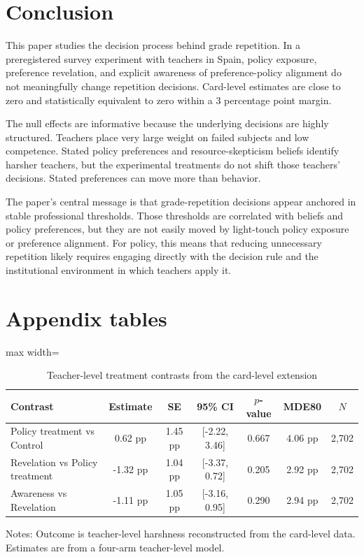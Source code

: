 \documentclass[12pt,a4paper]{article}
\newcommand{\ci}[2]{[#1, #2]}
\begin{document}
\section{Conclusion}

This paper studies the decision process behind grade repetition. In a preregistered survey experiment with teachers in Spain, policy exposure, preference revelation, and explicit awareness of preference-policy alignment do not meaningfully change repetition decisions. Card-level estimates are close to zero and statistically equivalent to zero within a 3 percentage point margin.

The null effects are informative because the underlying decisions are highly structured. Teachers place very large weight on failed subjects and low competence. Stated policy preferences and resource-skepticism beliefs identify harsher teachers, but the experimental treatments do not shift those teachers' decisions. Stated preferences can move more than behavior.

The paper's central message is that grade-repetition decisions appear anchored in stable professional thresholds. Those thresholds are correlated with beliefs and policy preferences, but they are not easily moved by light-touch policy exposure or preference alignment. For policy, this means that reducing unnecessary repetition likely requires engaging directly with the decision rule and the institutional environment in which teachers apply it.

\newpage
\appendix

\section{Appendix tables}

\begin{table}[!htbp]
\centering
\caption{Teacher-level treatment contrasts from the card-level extension}
\label{tab:teacher_extension}
\begin{threeparttable}
\begin{adjustbox}{max width=\textwidth}
\begin{tabular}{lcccccc}
\toprule
Contrast & Estimate & SE & 95\% CI & \(p\)-value & MDE80 & \(N\) \\
\midrule
Policy treatment vs Control & 0.62 pp & 1.45 pp & \ci{-2.22}{3.46} & 0.667 & 4.06 pp & 2,702 \\
Revelation vs Policy treatment & -1.32 pp & 1.04 pp & \ci{-3.37}{0.72} & 0.205 & 2.92 pp & 2,702 \\
Awareness vs Revelation & -1.11 pp & 1.05 pp & \ci{-3.16}{0.95} & 0.290 & 2.94 pp & 2,702 \\
\bottomrule
\end{tabular}
\end{adjustbox}
\begin{tablenotes}[flushleft]
\footnotesize
\item Notes: Outcome is teacher-level harshness reconstructed from the card-level data. Estimates are from a four-arm teacher-level model.
\end{tablenotes}
\end{threeparttable}
\end{table}
\end{document}
